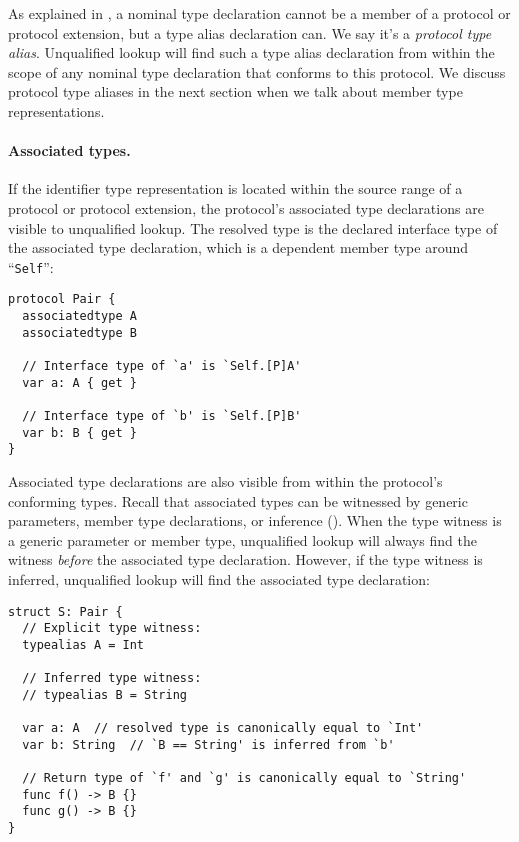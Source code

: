 \documentclass[../generics]{subfiles}
\begin{document}
As explained in , a nominal type declaration cannot be a member of a protocol or protocol extension, but a type alias declaration can. We say it's a \emph{protocol type alias}. Unqualified lookup will find such a type alias declaration from within the scope of any nominal type declaration that conforms to this protocol. We discuss protocol type aliases in the next section when we talk about member type representations.

\paragraph{Associated types.}
If the identifier type representation is located within the source range of a protocol or protocol extension, the protocol's associated type declarations are visible to unqualified lookup. The resolved type is the declared interface type of the associated type declaration, which is a dependent member type around ``\texttt{Self}'':
\begin{Verbatim}
protocol Pair {
  associatedtype A
  associatedtype B

  // Interface type of `a' is `Self.[P]A'
  var a: A { get }

  // Interface type of `b' is `Self.[P]B'
  var b: B { get }
}
\end{Verbatim}

Associated type declarations are also visible from within the protocol's conforming types. Recall that associated types can be witnessed by generic parameters, member type declarations, or inference (). When the type witness is a generic parameter or member type, unqualified lookup will always find the witness \emph{before} the associated type declaration. However, if the type witness is inferred, unqualified lookup will find the associated type declaration:
\begin{Verbatim}
struct S: Pair {
  // Explicit type witness:
  typealias A = Int

  // Inferred type witness:
  // typealias B = String

  var a: A  // resolved type is canonically equal to `Int'
  var b: String  // `B == String' is inferred from `b'

  // Return type of `f' and `g' is canonically equal to `String'
  func f() -> B {}
  func g() -> B {}
}
\end{Verbatim}
\end{document}

